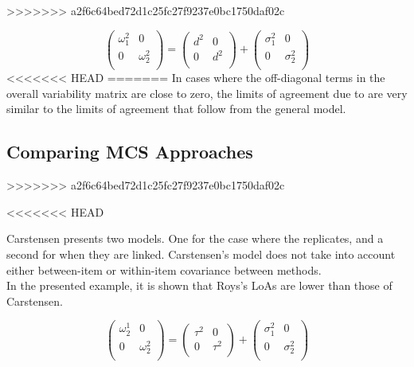 \documentclass[12pt, a4paper]{report}
\theoremstyle{plain}
\theoremstyle{definition}
\theoremstyle{remark}
\begin{document}
>>>>>>> a2f6c64bed72d1c25fc27f9237e0bc1750daf02c


\[\left(\begin{array}{cc}
\omega^2_1  & 0 \\
0 & \omega^2_2 \\
\end{array}  \right)
=  \left(
\begin{array}{cc}
d^2  & 0 \\
0 & d^2 \\
\end{array} \right)+
\left(
\begin{array}{cc}
\sigma^2_1  & 0 \\
0 & \sigma^2_2 \\
\end{array}\right)
\]
<<<<<<< HEAD
=======
In cases where the off-diagonal terms in the overall variability
matrix are close to zero, the limits of agreement due to \citet{BXC2008} are very similar to the limits of agreement that follow from the general model.




\subsection{Comparing MCS Approaches}


>>>>>>> a2f6c64bed72d1c25fc27f9237e0bc1750daf02c


<<<<<<< HEAD
	
	
	Carstensen presents two models. One for the case where the replicates, and a second for when they are linked.
	Carstensen's model does not take into account either between-item or within-item covariance between methods.\\
	In the presented example, it is shown that Roys's LoAs are lower than those of Carstensen.
	
	
	
	
	\[\left(\begin{array}{cc}
	\omega^1_2  & 0 \\
	0 & \omega^2_2 \\
	\end{array}  \right)
	=  \left(
	\begin{array}{cc}
	\tau^2  & 0 \\
	0 & \tau^2 \\
	\end{array} \right)+
	\left(
	\begin{array}{cc}
	\sigma^2_1  & 0 \\
	0 & \sigma^2_2 \\
	\end{array}\right)
	\]
	
\end{document}
